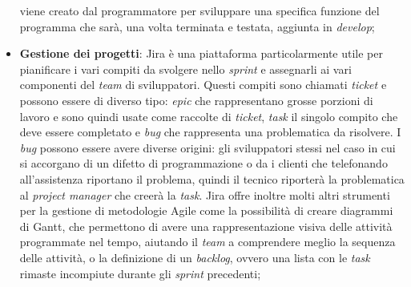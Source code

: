 \begin{itemize}
            viene creato dal programmatore per sviluppare una specifica funzione del programma che sarà, una volta 
            terminata e testata, aggiunta in \textit{develop};
      \item \textbf{Gestione dei progetti}: Jira è una piattaforma particolarmente utile per pianificare i vari 
            compiti da svolgere nello \textit{sprint} e assegnarli ai vari componenti del \textit{team} di sviluppatori. 
            Questi compiti sono chiamati \textit{ticket} e possono essere di diverso tipo: \textit{epic} che rappresentano 
            grosse porzioni di lavoro e sono quindi usate come raccolte di \textit{ticket}, \textit{task} il singolo 
            compito che deve essere completato e \textit{bug} che rappresenta una problematica da risolvere.
            I \textit{bug} possono essere avere diverse origini: gli sviluppatori stessi nel caso in cui si accorgano 
            di un difetto di programmazione o da i clienti che telefonando all'assistenza riportano il problema, 
            quindi il tecnico riporterà la problematica al \textit{project manager} che creerà la \textit{task}. Jira offre inoltre 
            molti altri strumenti per la gestione di metodologie Agile come la possibilità di creare diagrammi di Gantt, che 
            permettono di avere una rappresentazione visiva delle attività programmate nel tempo, aiutando il \textit{team} 
            a comprendere meglio la sequenza delle attività, o la definizione di un \textit{backlog}, ovvero una lista con le \textit{task} 
            rimaste incompiute durante gli \textit{sprint} precedenti;
\end{itemize}